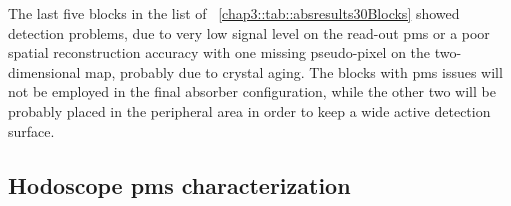The last five blocks in the list of \tablename~\ref{chap3::tab::absresults30Blocks} showed detection problems, due to very low signal level on the read-out \glspl{pm} or a poor spatial reconstruction accuracy with one missing pseudo-pixel on the two-dimensional map, probably due to crystal aging. The blocks with \glspl{pm} issues will not be employed in the final absorber configuration, while the other two will be probably placed in the peripheral area in order to keep a wide active detection surface.   

\newpage

\subsection{Hodoscope \glspl{pm} characterization}\label{chap3::subsec::hodoPMchar}         


